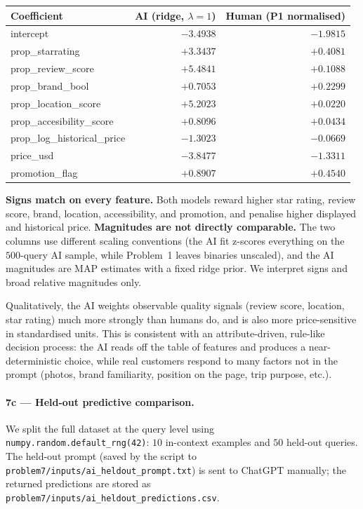 \documentclass[11pt]{article}
\begin{document}
\begin{center}
\begin{tabular}{lrr}
\toprule
Coefficient & AI (ridge, $\lambda=1$) & Human (P1 normalised) \\
\midrule
intercept                    & $-3.4938$ & $-1.9815$ \\
prop\_starrating             & $+3.3437$ & $+0.4081$ \\
prop\_review\_score          & $+5.4841$ & $+0.1088$ \\
prop\_brand\_bool            & $+0.7053$ & $+0.2299$ \\
prop\_location\_score        & $+5.2023$ & $+0.0220$ \\
prop\_accesibility\_score    & $+0.8096$ & $+0.0434$ \\
prop\_log\_historical\_price & $-1.3023$ & $-0.0669$ \\
price\_usd                   & $-3.8477$ & $-1.3311$ \\
promotion\_flag              & $+0.8907$ & $+0.4540$ \\
\bottomrule
\end{tabular}
\end{center}

\textbf{Signs match on every feature.} Both models reward higher star
rating, review score, brand, location, accessibility, and promotion,
and penalise higher displayed and historical price.
\textbf{Magnitudes are not directly comparable.} The two columns use
different scaling conventions (the AI fit z-scores everything on the
$500$-query AI sample, while Problem~1 leaves binaries unscaled), and
the AI magnitudes are MAP estimates with a fixed ridge prior. We
interpret signs and broad relative magnitudes only.

Qualitatively, the AI weights observable quality signals
(review score, location, star rating) much more strongly than humans
do, and is also more price-sensitive in standardised units. This is
consistent with an attribute-driven, rule-like decision process: the
AI reads off the table of features and produces a near-deterministic
choice, while real customers respond to many factors not in the prompt
(photos, brand familiarity, position on the page, trip purpose, etc.).

\paragraph{7c --- Held-out predictive comparison.}
We split the full dataset at the query level using
\texttt{numpy.random.default\_rng(42)}: $10$ in-context examples and
$50$ held-out queries. The held-out prompt (saved by the script to
\texttt{problem7/inputs/ai\_heldout\_prompt.txt}) is sent to ChatGPT
manually; the returned predictions are stored as
\texttt{problem7/inputs/ai\_heldout\_predictions.csv}.
\end{document}
